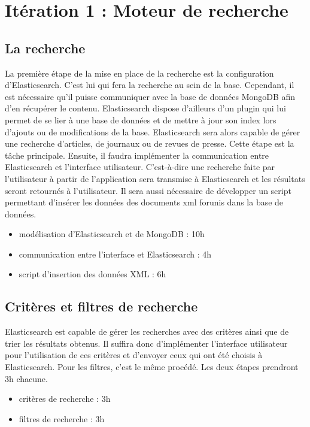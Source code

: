 \section{Itération 1 : Moteur de recherche}
\label{sec:moteur_rech}
	\subsection{La recherche} 
	\label{subsec:recherche}
		La première étape de la mise en place de la recherche est la configuration d'Elasticsearch. C'est lui qui fera la recherche au sein de la base. Cependant, il est nécessaire qu'il puisse communiquer avec la base de données MongoDB afin d'en récupérer le contenu. Elasticsearch dispose d'ailleurs d'un plugin qui lui permet de se lier à une base de données et de mettre à jour son index lors d'ajouts ou de modifications de la base. Elasticsearch sera alors capable de gérer une recherche d'articles, de journaux ou de revues de presse. Cette étape est la tâche principale. Ensuite, il faudra implémenter la communication entre Elasticsearch et l'interface utilisateur. C'est-à-dire une recherche faite par l'utilisateur à partir de l'application sera transmise à Elasticsearch et les résultats seront retournés à l'utilisateur. Il sera aussi nécessaire de développer un script permettant d'insérer les données des documents xml forunis dans la base de données.

		\begin{itemize}
			\item modélisation d'Elasticsearch et de MongoDB : 10h
			\item communication entre l'interface et Elasticsearch : 4h
			\item script d'insertion des données XML : 6h
		\end{itemize}

	\subsection{Critères et filtres de recherche} 
	\label{subsec:crit_filtre}
		Elasticsearch est capable de gérer les recherches avec des critères ainsi que de trier les résultats obtenus. Il suffira donc d'implémenter l'interface utilisateur pour l'utilisation de ces critères et d'envoyer ceux qui ont été choisis à Elasticsearch. Pour les filtres, c'est le même procédé. Les deux étapes prendront 3h chacune.

		\begin{itemize}
			\item critères de recherche : 3h
			\item filtres de recherche : 3h
		\end{itemize}

